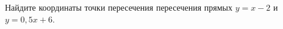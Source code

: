 \begin{ex}
	\begin{condition}
		Найдите координаты точки пересечения пересечения прямых \( y=x-2 \) и \( y=0,5x+6 \).
	\end{condition}
\end{ex}